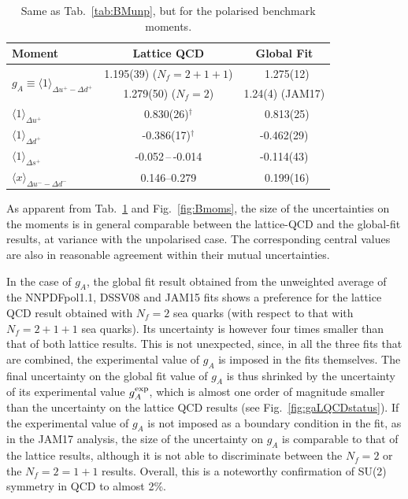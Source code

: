 \begin{table}[!t]
\centering
\renewcommand{\arraystretch}{1.2}
\begin{tabular}{lcc}
\toprule
Moment & Lattice QCD & Global Fit\\
\midrule
\multirow{2}{*}{$g_A\equiv\langle 1\rangle_{\Delta u^+ - \Delta d^+}$} 
& 1.195(39) ($N_f=2+1+1$) 
& \ 1.275(12) \\
& 1.279(50) ($N_f=2$) 
& 1.24(4) (JAM17)\\
$\langle 1 \rangle_{\Delta u^+}$     
& 0.830(26)$^\dagger$ 
& \ 0.813(25)\\
$\langle 1 \rangle_{\Delta d^+}$     
& -0.386(17)$^\dagger$ 
& -0.462(29)\\
$\langle 1 \rangle_{\Delta s^+}$     
& -0.052\,--\,-0.014
& -0.114(43)\\
$\langle x\rangle_{\Delta u^- - \Delta d^-}$       
& \numrange{0.146}{0.279} 
& \ 0.199(16)\\
\bottomrule
\end{tabular}
\caption{\small Same as Tab.~\ref{tab:BMunp}, but for the polarised benchmark 
moments.}
\label{tab:BMpol}
\end{table}

As apparent from Tab.~\ref{tab:BMpol} and Fig.~\ref{fig:Bmoms}, the size of 
the uncertainties on the moments is in general comparable between the 
lattice-QCD and the global-fit results, at variance with the unpolarised case.
%
The corresponding central values are also in reasonable agreement within their
mutual uncertainties.

In the case of $g_A$, the global fit result obtained from the unweighted 
average of the NNPDFpol1.1, DSSV08 and JAM15 fits shows a preference for the
lattice QCD result obtained with $N_f=2$ sea quarks (with respect to that with 
$N_f=2+1+1$ sea quarks).
%
Its uncertainty is however four times smaller than that of both lattice results.
%
This is not unexpected, since, in all the three fits that are combined, the 
experimental value of $g_A$ is imposed in the fits themselves.
%
The final uncertainty on the global fit value of $g_A$ is thus shrinked by 
the uncertainty of its experimental value $g_A^{\rm exp}$, which is almost
one order of magnitude smaller than the uncertainty on the lattice QCD results
(see Fig.~\ref{fig:gaLQCDstatus}).
%
If the experimental value of $g_A$ is not imposed as a boundary condition in 
the fit, as in the JAM17 analysis, the size of the uncertainty on $g_A$ is 
comparable to that of the lattice results, although it is not able to 
discriminate between the $N_f=2$ or the $N_f=2=1+1$ results.
%
Overall, this is a noteworthy confirmation of SU(2) symmetry in QCD to
almost 2\%.

